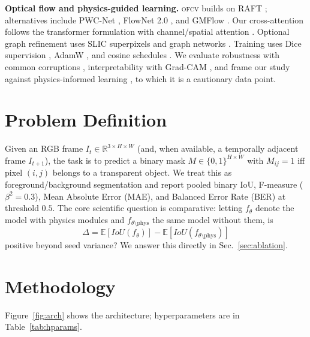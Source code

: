 \documentclass{article}
\newcommand{\ofcv}{\textsc{ofcv}}
\newcommand{\iou}{IoU}
\begin{document}
\textbf{Optical flow and physics-guided learning.} \ofcv{} builds on RAFT
\cite{teed2020raft}; alternatives include PWC-Net \cite{sun2018pwcnet}, FlowNet
2.0 \cite{ilg2017flownet2}, and GMFlow \cite{xu2022gmflow}. Our cross-attention
follows the transformer formulation \cite{vaswani2017transformer} with
channel/spatial attention \cite{woo2018cbam,hu2018senet}. Optional graph
refinement uses SLIC superpixels \cite{achanta2012slic} and graph networks
\cite{kipf2017gcn,xu2019gin}. Training uses Dice supervision
\cite{milletari2016vnet}, AdamW \cite{loshchilov2019adamw}, and cosine schedules
\cite{loshchilov2017sgdr}. We evaluate robustness with common corruptions
\cite{hendrycks2019robustness}, interpretability with Grad-CAM
\cite{selvaraju2017gradcam}, and frame our study against physics-informed
learning \cite{karniadakis2021piml}, to which it is a cautionary data point.

\section{Problem Definition}
Given an RGB frame $I_t\in\mathbb{R}^{3\times H\times W}$ (and, when available, a
temporally adjacent frame $I_{t+1}$), the task is to predict a binary mask
$M\in\{0,1\}^{H\times W}$ with $M_{ij}=1$ iff pixel $(i,j)$ belongs to a
transparent object. We treat this as foreground/background segmentation and
report pooled binary \iou, F-measure ($\beta^2=0.3$), Mean Absolute Error
(MAE), and Balanced Error Rate (BER) at threshold $0.5$. The core scientific
question is comparative: letting $f_\theta$ denote the model with physics
modules and $f_{\theta\setminus\mathrm{phys}}$ the same model without them, is
\begin{equation}
\Delta = \mathbb{E}\!\left[\iou(f_\theta)\right]-\mathbb{E}\!\left[\iou(f_{\theta\setminus\mathrm{phys}})\right]
\end{equation}
positive beyond seed variance? We answer this directly in Sec.~\ref{sec:ablation}.

\section{Methodology}
\label{sec:method}
Figure~\ref{fig:arch} shows the architecture; hyperparameters are in
Table~\ref{tab:hparams}.
\end{document}
